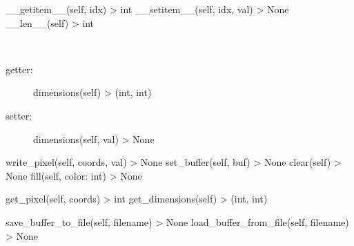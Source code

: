 \documentclass[letterpaper,10pt,english,openany,oneside]{sphinxmanual}
\begin{document}
\begin{fulllineitems}
\begin{fulllineitems}
\sphinxAtStartPar
\_\_getitem\_\_(self, idx) \sphinxhyphen{}\textgreater{} int
\_\_setitem\_\_(self, idx, val) \sphinxhyphen{}\textgreater{} None
\_\_len\_\_(self) \sphinxhyphen{}\textgreater{} int

\end{fulllineitems}



\begin{fulllineitems}
~\begin{description}
\item[{getter:}] \leavevmode
\sphinxAtStartPar
dimensions(self) \sphinxhyphen{}\textgreater{} (int, int)

\item[{setter:}] \leavevmode
\sphinxAtStartPar
dimensions(self, val) \sphinxhyphen{}\textgreater{} None

\end{description}

\end{fulllineitems}



\begin{fulllineitems}
\sphinxAtStartPar
write\_pixel(self, coords, val) \sphinxhyphen{}\textgreater{} None
set\_buffer(self, buf) \sphinxhyphen{}\textgreater{} None
clear(self) \sphinxhyphen{}\textgreater{} None
fill(self, color: int) \sphinxhyphen{}\textgreater{} None

\end{fulllineitems}



\begin{fulllineitems}
\sphinxAtStartPar
get\_pixel(self, coords) \sphinxhyphen{}\textgreater{} int
get\_dimensions(self) \sphinxhyphen{}\textgreater{} (int, int)

\end{fulllineitems}



\begin{fulllineitems}
\sphinxAtStartPar
save\_buffer\_to\_file(self, filename) \sphinxhyphen{}\textgreater{} None
load\_buffer\_from\_file(self, filename) \sphinxhyphen{}\textgreater{} None

\end{fulllineitems}




\end{fulllineitems}
\end{document}
